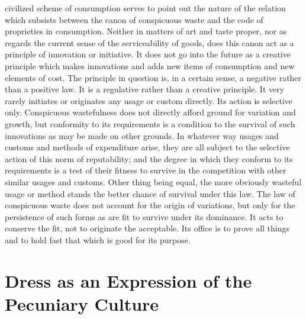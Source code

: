 \documentclass[12pt]{report}
\begin{document}
civilized scheme of consumption serves to point out the nature of the
relation which subsists between the canon of conspicuous waste and the
code of proprieties in consumption. Neither in matters of art and taste
proper, nor as regards the current sense of the serviceability of goods,
does this canon act as a principle of innovation or initiative. It does
not go into the future as a creative principle which makes innovations
and adds new items of consumption and new elements of cost. The
principle in question is, in a certain sense, a negative rather than a
positive law. It is a regulative rather than a creative principle. It
very rarely initiates or originates any usage or custom directly. Its
action is selective only. Conspicuous wastefulness does not directly
afford ground for variation and growth, but conformity to its
requirements is a condition to the survival of such innovations as may
be made on other grounds. In whatever way usages and customs and methods
of expenditure arise, they are all subject to the selective action of
this norm of reputability; and the degree in which they conform to its
requirements is a test of their fitness to survive in the competition
with other similar usages and customs. Other thing being equal, the more
obviously wasteful usage or method stands the better chance of survival
under this law. The law of conspicuous waste does not account for the
origin of variations, but only for the persistence of such forms as are
fit to survive under its dominance. It acts to conserve the fit, not to
originate the acceptable. Its office is to prove all things and to hold
fast that which is good for its purpose.




\chapter{Dress as an Expression of the Pecuniary Culture}
\end{document}
